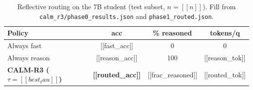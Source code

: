 \begin{table}[tb]
\caption{Reflective routing on the 7B student (test subset, $n=[[n]]$). Fill from
\texttt{calm\_r3/phase0\_results.json} and \texttt{phase1\_routed.json}.}
\label{tab:r3}
\centering
\small
\begin{tabular}{@{}lccc@{}}
\toprule
Policy & acc & \% reasoned & tokens/q \\
\midrule
Always fast            & [[fast_acc]]   & 0   & 0 \\
Always reason          & [[reason_acc]] & 100 & [[reason_tok]] \\
\textbf{CALM-R3 ($\tau{=}[[best_tau]]$)} & \textbf{[[routed_acc]]} & [[frac_reasoned]] & [[routed_tok]] \\
\bottomrule
\end{tabular}
\end{table}


